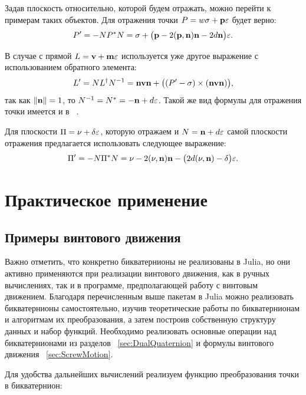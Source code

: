 Задав плоскость относительно, которой будем отражать, можно перейти к примерам таких объектов. Для отражения точки $P = w\sigma + \vb{p}\varepsilon$ будет верно:
\begin{equation*}
  P' = -N P^* N = \sigma + \big(\vb{p} - 2(\vb{p},\vb{n})\vb{n} - 2d\vb{n}\big)\varepsilon.
\end{equation*}

В случае с прямой $L = \vb{v} + \vb{m}\varepsilon$ используется уже другое выражение с использованием обратного элемента:
\begin{equation*}
  L' = N L^\dagger N^{-1} = \vb{n}\vb{v}\vb{n} + \big((P' - \sigma) \times (\vb{n}\vb{v}\vb{n})\big),
\end{equation*}
так как $\|\vb{n}\| = 1$, то $N^{-1} = N^* = -\vb{n} + d\varepsilon$. Такой же вид формулы для отражения точки имеется и в ~\cite{Goldman:2023}.

Для плоскости $\Pi = \vb{\nu} + \delta\varepsilon$, которую отражаем и $N = \vb{n} + d\varepsilon$ самой плоскости отражения предлагается использовать следующее выражение:
\begin{equation*}
  \Pi' = -N \Pi^* N = \vb{\nu} - 2(\vb{\nu},\vb{n})\vb{n} - \big(2d(\vb{\nu},\vb{n}) - \delta\big)\varepsilon.
\end{equation*}

\section{Практическое применение}

\subsection{Примеры винтового движения}

Важно отметить, что конкретно бикватернионы не реализованы в Julia, но они активно применяются при реализации винтового движения, как в ручных вычислениях, так и в программе, предполагающей работу с винтовым движением.
Благодаря перечисленным выше пакетам в Julia можно реализовать бикватернионы самостоятельно, изучив теоретические работы по бикватернионам и алгоритмам их преобразования, а затем построив собственную структуру данных и набор функций. Необходимо реализовать основные операции над бикватернионами из разделов ~\ref{sec:DualQuaternion} и формулы винтового движения ~\ref{sec:ScrewMotion}.

Для удобства дальнейших вычислений реализуем функцию преобразования точки в бикватернион:

